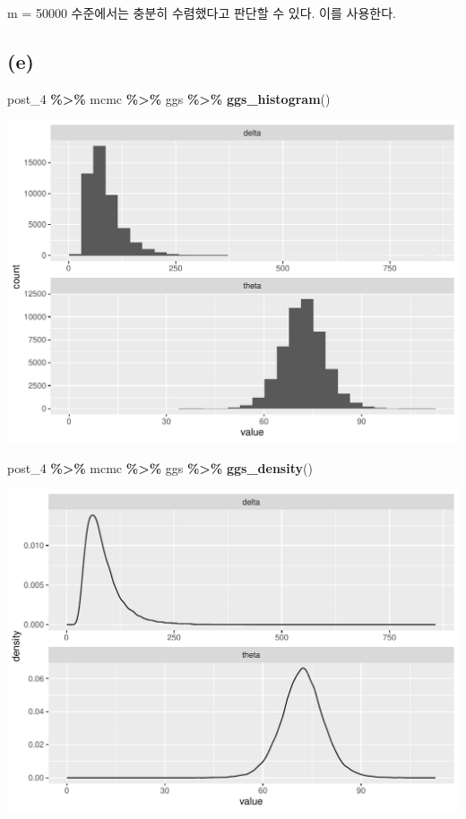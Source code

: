 \documentclass[
]{article}
\newenvironment{Shaded}{\begin{snugshade}}{\end{snugshade}}
\newcommand{\FunctionTok}[1]{\textcolor[rgb]{0.13,0.29,0.53}{\textbf{#1}}}
\newcommand{\NormalTok}[1]{#1}
\newcommand{\SpecialCharTok}[1]{\textcolor[rgb]{0.81,0.36,0.00}{\textbf{#1}}}
\begin{document}
m = 50000 수준에서는 충분히 수렴했다고 판단할 수 있다. 이를 사용한다.

\subsection{(e)}\label{e}

\begin{Shaded}
\begin{Highlighting}[]
\NormalTok{post\_4 }\SpecialCharTok{\%\textgreater{}\%}\NormalTok{ mcmc }\SpecialCharTok{\%\textgreater{}\%}\NormalTok{ ggs }\SpecialCharTok{\%\textgreater{}\%} \FunctionTok{ggs\_histogram}\NormalTok{()}
\end{Highlighting}
\end{Shaded}

\begin{center}\includegraphics[width=0.8\linewidth]{Bayes_stat_hw3_files/figure-latex/unnamed-chunk-49-1} \end{center}

\begin{Shaded}
\begin{Highlighting}[]
\NormalTok{post\_4 }\SpecialCharTok{\%\textgreater{}\%}\NormalTok{ mcmc }\SpecialCharTok{\%\textgreater{}\%}\NormalTok{ ggs }\SpecialCharTok{\%\textgreater{}\%} \FunctionTok{ggs\_density}\NormalTok{()}
\end{Highlighting}
\end{Shaded}

\begin{center}\includegraphics[width=0.8\linewidth]{Bayes_stat_hw3_files/figure-latex/unnamed-chunk-49-2} \end{center}
\end{document}

